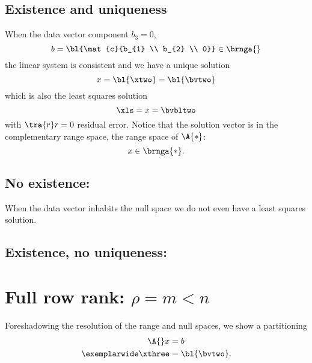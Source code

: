 \subsection{Existence and uniqueness}
When the data vector component $b_{3} = 0$, 
  \begin{equation}
      b = \bl{\mat{c}{b_{1} \\ b_{2} \\ 0}} \in \brnga{}
  \end{equation}
the linear system is consistent and we have a unique solution 
  \begin{equation}
    x = \bl{\xtwo} = \bl{\bvtwo}
  \end{equation}
which is also the least squares solution
  \begin{equation}
    \xls = x = \bvbltwo
  \end{equation}
with $\tra{r}r = 0$ residual error. Notice that the solution vector is in the complementary range space, the range space of $\A{*}$:
  \begin{equation}
      x \in \brnga{*}.
  \end{equation}

\subsection{No existence: }
When the data vector inhabits the null space we do not even have a least squares solution. 

\subsection{Existence, no uniqueness: }


\section{Full row rank: $\rho = m < n$}
Foreshadowing the resolution of the range and null spaces, we show a partitioning
  \begin{equation}
    \begin{split}
      \A{} x &= b \\
      \exemplarwide \xthree &= \bl{\bvtwo}.
    \label{eqn:frr}
    \end{split}
  \end{equation}

